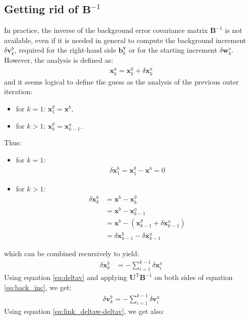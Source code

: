\documentclass[12pt]{scrartcl}
\begin{document}
\subsection{Getting rid of $\mathbf{B}^{-1}$}
In practice, the inverse of the background error covariance matrix $\mathbf{B}^{-1}$ is not available, even if it is needed in general to compute the background increment $\delta \mathbf{v}^b_k$, required for the right-hand side $\mathbf{b}^\mathbf{v}_k$ or for the starting increment $\delta \mathbf{w}^s_k$. However, the analysis is defined as:
\begin{align}
\mathbf{x}^a_k = \mathbf{x}^g_k + \delta \mathbf{x}^a_k
\end{align}
and it seems logical to define the guess as the analysis of the previous outer iteration:
\begin{itemize}
\item for $k = 1$: $\mathbf{x}^g_1 = \mathbf{x}^b$,
\item for $k > 1$: $\mathbf{x}^g_k = \mathbf{x}^a_{k-1}$.
\end{itemize}
Thus:
\begin{itemize}
\item for $k = 1$:
\begin{align}
\delta \mathbf{x}^b_1 = \mathbf{x}^g_1 - \mathbf{x}^b = 0
\end{align}
\item for $k > 1$:
\begin{align}
\delta \mathbf{x}^b_k & = \mathbf{x}^b - \mathbf{x}^g_k \nonumber \\
& = \mathbf{x}^b - \mathbf{x}^a_{k-1} \nonumber \\
& = \mathbf{x}^b - \left(\mathbf{x}^g_{k-1} + \delta \mathbf{x}^a_{k-1}\right) \nonumber \\
& = \delta \mathbf{x}^b_{k-1} - \delta \mathbf{x}^a_{k-1}
\end{align}
\end{itemize}
which can be combined recursively to yield:
\begin{align}
\label{eq:back_inc}
\delta \mathbf{x}^b_k & = - \sum_{i=1}^{k-1} \delta \mathbf{x}^a_i
\end{align}
Using equation \eqref{eq:deltav} and applying $\mathbf{U}^\mathrm{T} \mathbf{B}^{-1}$ on both sides of equation \eqref{eq:back_inc}, we get:
\begin{align}
\label{eq:back_inc_U}
\boxed{\delta \mathbf{v}^b_k = - \sum_{i=1}^{k-1} \delta \mathbf{v}^a_i}
\end{align}
Using equation \eqref{eq:link_deltaw-deltav}, we get also:
\end{document}
